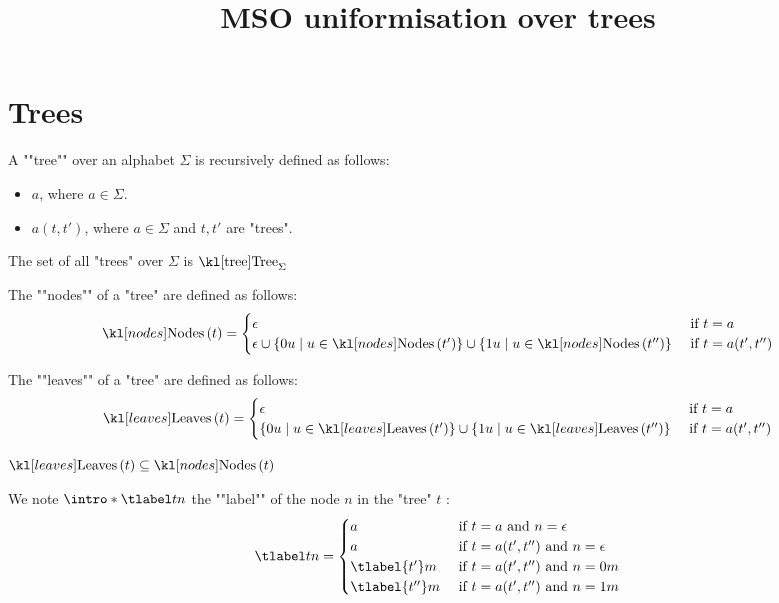 \documentclass{article}
\begin{document}
\title{MSO uniformisation over trees}

\maketitle

\section{Trees}


\begin{definition}[Tree]
	A ""tree"" over an alphabet $\Sigma$ is recursively defined as follows:
	\begin{itemize}
		\item $a$, where $a \in \Sigma$.
		\item $a(t,t')$, where $a \in \Sigma$ and $t, t'$ are "trees".
	\end{itemize}

	The set of all "trees" over $\Sigma$ is $\tree_{\Sigma}$
\end{definition}

\begin{definition}[Nodes]
	The ""nodes"" of a "tree" are defined as follows:
	\[
		\nodes t = \begin{cases}
			\epsilon                                & \text{ if } t = a         \\
			\epsilon \cup \setdef {0u} {u \in \nodes {t'}}
			\cup \setdef {1u} {u \in \nodes {t''} } & \text{ if } t = a(t',t'')
		\end{cases}
	\]
\end{definition}


\begin{definition}[Leaves]
	The ""leaves"" of a "tree" are defined as follows:
	\[
		\leaves t = \begin{cases}
			\epsilon                                 & \text{ if } t = a         \\
			\setdef {0u} {u \in \leaves {t'}}
			\cup \setdef {1u} {u \in \leaves {t''} } & \text{ if } t = a(t',t'')
		\end{cases}
	\]
\end{definition}

\begin{remark}
	$\leaves t \subseteq \nodes t$
\end{remark}

\begin{definition}
	We note $\intro* \tlabel t n$ the ""label"" of the node $n$ in the "tree" $t$ :
	\[
		\tlabel t n =   \begin{cases}
			a               & \text{ if } t = a \text{ and } n = \epsilon         \\
			a               & \text{ if } t = a(t',t'') \text{ and } n = \epsilon \\
			\tlabel {t'} m  & \text{ if } t = a(t',t'') \text{ and } n = 0m       \\
			\tlabel {t''} m & \text{ if } t = a(t',t'') \text{ and } n = 1m
		\end{cases}
	\]
\end{definition}
\end{document}

